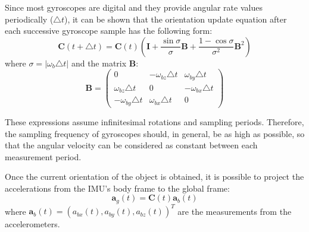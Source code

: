 Since most gyroscopes are digital and they provide angular rate values periodically ($\triangle t$), it can be shown that the orientation update equation after each successive gyroscope sample has the following form:
\begin{equation}
\label{eqn_dcm_update}
	\boldsymbol{C}(t+\triangle t)=\boldsymbol{C}(t) \left( \boldsymbol{I}+\frac{\sin \sigma}{\sigma}\boldsymbol{B}+\frac{1-\cos\sigma}{\sigma^2}\boldsymbol{B}^2 \right)
\end{equation}
where $\sigma=|\omega_b\triangle t|$ and the matrix $\boldsymbol{B}$:
\begin{equation}
\label{eqn_skew_matrix_upd}
	\boldsymbol{B}=
	\begin{pmatrix}
		0&-\omega_{bz}\triangle t&\omega_{by}\triangle t\\
		\omega_{bz}\triangle t&0&-\omega_{bx}\triangle t\\
		-\omega_{by}\triangle t&\omega_{bx}\triangle t&0
	\end{pmatrix}		
\end{equation}	

These expressions assume infinitesimal rotations and sampling periods. Therefore, the sampling frequency of gyroscopes should, in general, be as high as possible, so that the angular velocity can be considered as constant between each measurement period.

Once the current orientation of the object is obtained, it is possible to project the accelerations from the IMU's body frame to the global frame:
\begin{equation}
\label{eqn_acc_proy}
	\boldsymbol{a}_g(t)=\boldsymbol{C}(t)\boldsymbol{a}_b(t)
\end{equation}
where $\boldsymbol{a}_b(t)=(a_{bx}(t),a_{by}(t),a_{bz}(t))^T$ are the measurements from the accelerometers.

